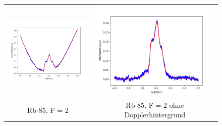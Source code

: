 \documentclass[a4paper,parskip]{scrartcl}
\begin{document}
\begin{figure}[p]
\begin{tabular}{cc}
    \includegraphics[scale = 0.45]{./saturation/peak3/fit.png}  &  \includegraphics[scale = 0.45]{./saturation/peak3/gaussCorrected.png}  \\
    {\footnotesize Rb-85, F = 2} & {\footnotesize Rb-85, F = 2 ohne Dopplerhintergrund}  \\

\end{tabular}
\end{figure}
\end{document}
